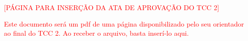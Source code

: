 \begin{titlepage}

    \begin{center}
    \textcolor{red}{[PÁGINA PARA INSERÇÃO DA ATA DE APROVAÇÃO DO TCC 2]}

    \textcolor{red}{Este documento será um pdf de uma página disponibilizado pelo seu orientador ao final do TCC 2. Ao receber o arquivo, basta inserí-lo aqui.}
    \end{center}

\end{titlepage}